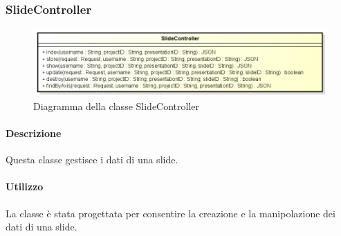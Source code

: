 \newpage
\subsubsection{SlideController}
\begin{figure}[h]
\centering
\includegraphics[width=0.8\linewidth]{img/back_end_http_controllers_slideController}
\caption[Diagramma della classe SlideController]{Diagramma della classe SlideController}
\label{fig:back_end_http_controllers_slideController}
\end{figure}

	\paragraph{Descrizione}
		Questa classe gestisce i dati di una slide.
	\paragraph{Utilizzo}
		La classe è stata progettata per consentire la creazione e la manipolazione dei dati di una slide.

